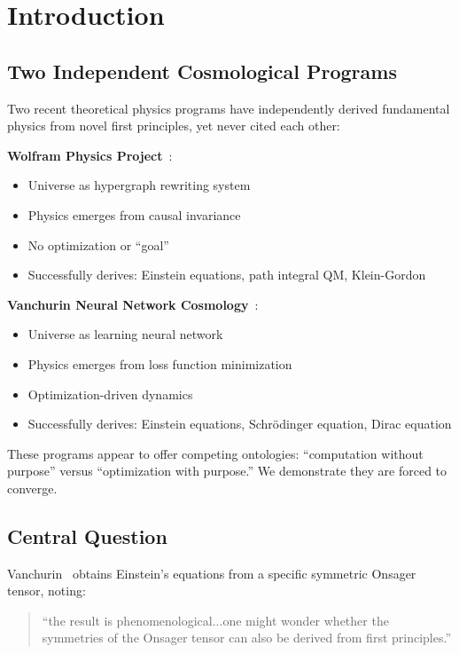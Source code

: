 \documentclass[11pt]{article}
\theoremstyle{definition}
\theoremstyle{remark}
\begin{document}
\section{Introduction}

\subsection{Two Independent Cosmological Programs}

Two recent theoretical physics programs have independently derived fundamental physics from novel first principles, yet never cited each other:

\textbf{Wolfram Physics Project}~\cite{Gorard2020,Wolfram2020}:
\begin{itemize}
\item Universe as hypergraph rewriting system
\item Physics emerges from causal invariance
\item No optimization or ``goal''
\item Successfully derives: Einstein equations, path integral QM, Klein-Gordon
\end{itemize}

\textbf{Vanchurin Neural Network Cosmology}~\cite{Vanchurin2020,Vanchurin2025}:
\begin{itemize}
\item Universe as learning neural network
\item Physics emerges from loss function minimization
\item Optimization-driven dynamics
\item Successfully derives: Einstein equations, Schrödinger equation, Dirac equation
\end{itemize}

These programs appear to offer competing ontologies: ``computation without purpose'' versus ``optimization with purpose.'' We demonstrate they are forced to converge.

\subsection{Central Question}

Vanchurin~\cite{Vanchurin2020} obtains Einstein's equations from a specific symmetric Onsager tensor, noting:

\begin{quote}
``the result is phenomenological...one might wonder whether the symmetries of the Onsager tensor can also be derived from first principles.''
\end{quote}
\end{document}
